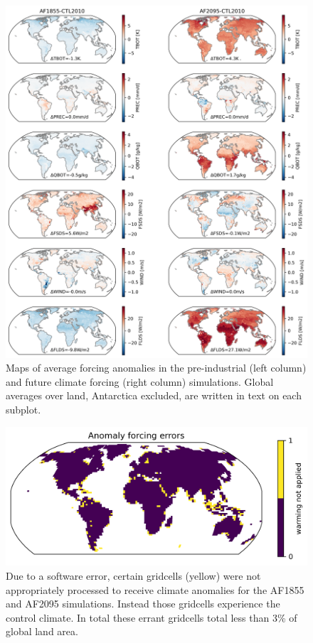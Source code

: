 \documentclass[11pt]{article}
\begin{document}
\begin{figure}[h]
\centering
\includegraphics[width=\textwidth]{../figs/supp/anomalies.png}
\caption{Maps of average forcing anomalies in the pre-industrial (left column) and future climate forcing (right column) simulations. Global averages over land, Antarctica excluded, are written in text on each subplot.}
\label{supp:anomalies}
\end{figure}

\begin{figure}[h]
\centering
\includegraphics[width=\textwidth]{../figs/supp/anomaly_errors.png}
\caption{Due to a software error, certain gridcells (yellow) were not appropriately processed to receive climate anomalies for the AF1855 and AF2095 simulations. Instead those gridcells experience the control climate. In total these errant gridcells total less than 3\% of global land area.  }
\label{supp:abug}
\end{figure}
\end{document}
